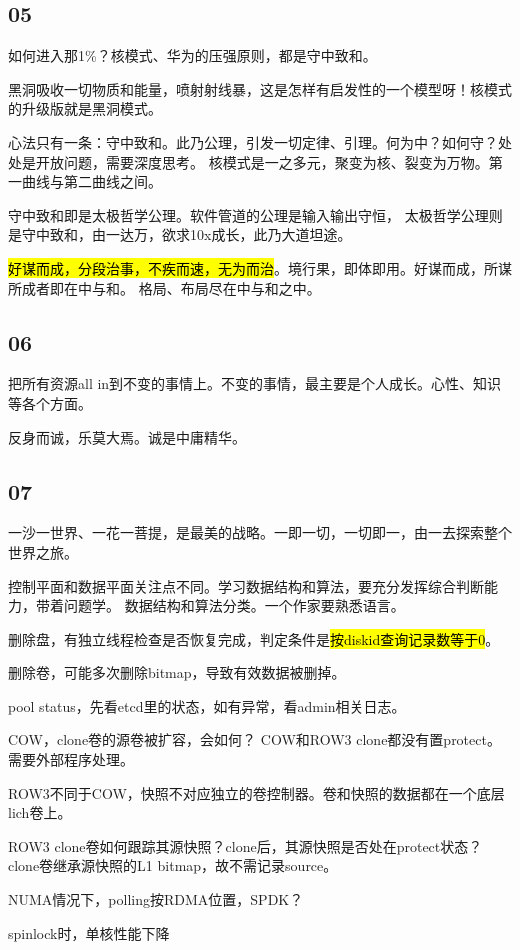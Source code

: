 \subsection{05}

如何进入那1\%？核模式、华为的压强原则，都是守中致和。

黑洞吸收一切物质和能量，喷射射线暴，这是怎样有启发性的一个模型呀！核模式的升级版就是黑洞模式。

心法只有一条：守中致和。此乃公理，引发一切定律、引理。何为中？如何守？处处是开放问题，需要深度思考。
核模式是一之多元，聚变为核、裂变为万物。第一曲线与第二曲线之间。

守中致和即是太极哲学公理。软件管道的公理是输入输出守恒，
太极哲学公理则是守中致和，由一达万，欲求10x成长，此乃大道坦途。

\hl{好谋而成，分段治事，不疾而速，无为而治}。境行果，即体即用。好谋而成，所谋所成者即在中与和。
格局、布局尽在中与和之中。

\subsection{06}

把所有资源all in到不变的事情上。不变的事情，最主要是个人成长。心性、知识等各个方面。

反身而诚，乐莫大焉。诚是中庸精华。

\subsection{07}

一沙一世界、一花一菩提，是最美的战略。一即一切，一切即一，由一去探索整个世界之旅。

控制平面和数据平面关注点不同。学习数据结构和算法，要充分发挥综合判断能力，带着问题学。
数据结构和算法分类。一个作家要熟悉语言。

删除盘，有独立线程检查是否恢复完成，判定条件是\hl{按diskid查询记录数等于0}。

删除卷，可能多次删除bitmap，导致有效数据被删掉。

pool status，先看etcd里的状态，如有异常，看admin相关日志。

COW，clone卷的源卷被扩容，会如何？
COW和ROW3 clone都没有置protect。需要外部程序处理。

ROW3不同于COW，快照不对应独立的卷控制器。卷和快照的数据都在一个底层lich卷上。

ROW3 clone卷如何跟踪其源快照？clone后，其源快照是否处在protect状态？
clone卷继承源快照的L1 bitmap，故不需记录source。

NUMA情况下，polling按RDMA位置，SPDK？

spinlock时，单核性能下降
